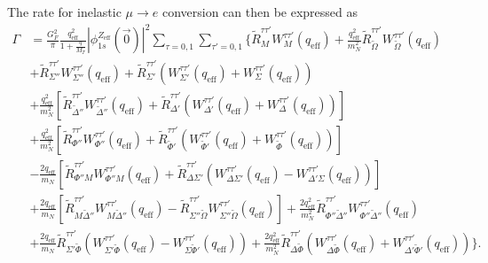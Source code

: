 \documentclass[12pt,letterpaper]{book}
\begin{document}
The rate for inelastic $\mu\rightarrow e$ conversion can then be expressed as
\begin{equation}
\begin{split}
\Gamma&=\frac{G_F^2}{\pi}\frac{q_\mathrm{eff}^2}{1+\frac{q}{M_T}}|\phi_{1s}^{Z_\mathrm{eff}}(\vec{0})|^2\sum_{\tau=0,1}\sum_{\tau'=0,1}\Bigg\{\tilde{R}_M^{\tau\tau'}W_M^{\tau\tau'}(q_\mathrm{eff})+\frac{q_\mathrm{eff}^2}{m_N^2}\tilde{R}_{\tilde{\Omega}}^{\tau\tau'}W_{\tilde{\Omega}}^{\tau\tau'}(q_\mathrm{eff})\\
&+\tilde{R}_{\Sigma''}^{\tau\tau'}W_{\Sigma''}^{\tau\tau'}(q_\mathrm{eff})+\tilde{R}_{\Sigma'}^{\tau\tau'}\left(W_{\Sigma'}^{\tau\tau'}(q_\mathrm{eff})+W_{\Sigma}^{\tau\tau'}(q_\mathrm{eff})\right)\\
&+\frac{q_\mathrm{eff}^2}{m_N^2}\left[\tilde{R}_{\tilde{\Delta}''}^{\tau\tau'}W_{\tilde{\Delta}''}^{\tau\tau'}(q_\mathrm{eff})+\tilde{R}_{\Delta'}^{\tau\tau'}\left(W_{\Delta'}^{\tau\tau'}(q_\mathrm{eff})+W_{\Delta}^{\tau\tau'}(q_\mathrm{eff})\right)\right]\\
&+\frac{q_\mathrm{eff}^2}{m_N^2}\left[\tilde{R}_{\Phi''}^{\tau\tau'}W_{\Phi''}^{\tau\tau'}(q_\mathrm{eff})+\tilde{R}_{\tilde{\Phi}'}^{\tau\tau'}\left(W_{\tilde{\Phi}'}^{\tau\tau'}(q_\mathrm{eff})+W_{\tilde{\Phi}}^{\tau\tau'}(q_\mathrm{eff})\right)\right]\\
&-\frac{2q_\mathrm{eff}}{m_N}\left[\tilde{R}_{\Phi'' M}^{\tau\tau'}W_{\Phi'' M}^{\tau\tau'}(q_\mathrm{eff})+\tilde{R}_{\Delta\Sigma'}^{\tau\tau'}\left(W_{\Delta\Sigma'}^{\tau\tau'}(q_\mathrm{eff})-W_{\Delta'\Sigma}^{\tau\tau'}(q_\mathrm{eff})\right)\right]\\
&+\frac{2q_\mathrm{eff}}{m_N}\left[\tilde{R}^{\tau\tau'}_{M\tilde{\Delta}''}W^{\tau\tau'}_{M\tilde{\Delta}''}(q_\mathrm{eff})-\tilde{R}^{\tau\tau'}_{\Sigma''\tilde{\Omega}}W^{\tau\tau'}_{\Sigma''\tilde{\Omega}}(q_\mathrm{eff})\right]+\frac{2q_\mathrm{eff}^2}{m_N^2}\tilde{R}_{\Phi''\tilde{\Delta}''}^{\tau\tau'}W^{\tau\tau'}_{\Phi''\tilde{\Delta}''}(q_\mathrm{eff})\\
&+\frac{2q_\mathrm{eff}}{m_N}\tilde{R}^{\tau\tau'}_{\Sigma'\tilde{\Phi}}\left(W^{\tau\tau'}_{\Sigma'\tilde{\Phi}}(q_\mathrm{eff})-W^{\tau\tau'}_{\Sigma\tilde{\Phi}'}(q_\mathrm{eff})\right)+\frac{2q_\mathrm{eff}^2}{m_N^2}\tilde{R}^{\tau\tau'}_{\Delta\tilde{\Phi}}\left(W^{\tau\tau'}_{\Delta\tilde{\Phi}}(q_\mathrm{eff})+W^{\tau\tau'}_{\Delta'\tilde{\Phi}'}(q_\mathrm{eff})\right)\Bigg\}.
\end{split}
\label{eq:inelastic_rate}
\end{equation}
\end{document}
